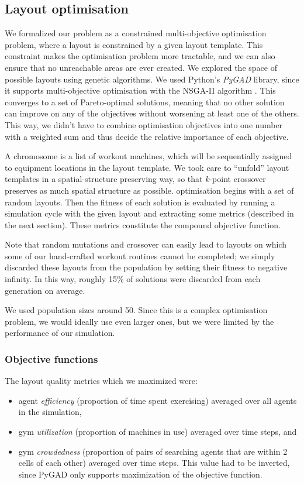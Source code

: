 \documentclass[9pt]{pnas-new}
\begin{document}
\subsection*{Layout optimisation}

We formalized our problem as a constrained multi-objective optimisation problem, where a layout is constrained by a given layout template. This constraint makes the optimisation problem more tractable, and we can also ensure that no unreachable areas are ever created.
We explored the space of possible layouts using genetic algorithms.
We used Python's {\it PyGAD} library, since it supports multi-objective optimisation with the NSGA-II algorithm \cite{nsga2}. This converges to a set of Pareto-optimal solutions, meaning that no other solution can improve on any of the objectives without worsening at least one of the others.
This way, we didn't have to combine optimisation objectives into one number with a weighted sum and thus decide the relative importance of each objective.

A chromosome is a list of workout machines, which will be sequentially assigned to equipment locations in the layout template. We took care to ``unfold'' layout templates in a spatial-structure preserving way, so that $k$-point crossover preserves as much spatial structure as possible.
optimisation begins with a set of random layouts.
Then the fitness of each solution is evaluated by running a simulation cycle with the given layout and extracting some metrics (described in the next section). These metrics constitute the compound objective function.

Note that random mutations and crossover can easily lead to layouts on which some of our hand-crafted workout routines cannot be completed; we simply discarded these layouts from the population by setting their fitness to negative infinity. In
this way, roughly 15\% of solutions were discarded from each generation on average.

We used population sizes around 50. Since this is a complex optimisation problem, we would ideally use even larger ones, but we were limited by the performance of our simulation.


\subsubsection*{Objective functions} \label{sec:objectives}

The layout quality metrics which we maximized were: 
\begin{itemize}
	\item agent {\it efficiency} (proportion of time spent exercising) averaged over all agents in the simulation,
	\item gym {\it utilization} (proportion of machines in use) averaged over time steps, and
	\item gym {\it crowdedness} (proportion of pairs of searching agents that are within 2 cells of each other)
    averaged over time steps. This value had to be inverted, since PyGAD only supports maximization of the objective function.
\end{itemize}
\end{document}
